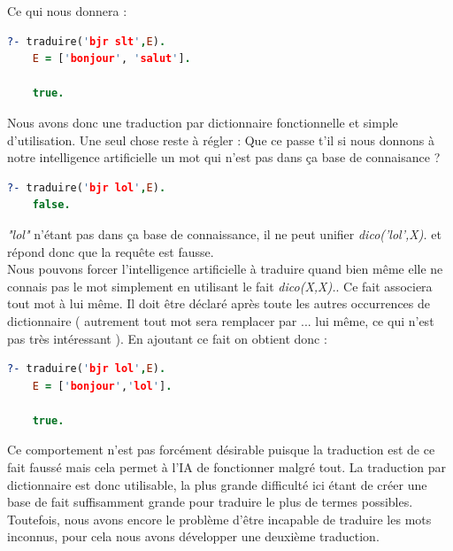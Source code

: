 \documentclass[11pt]{book}
\begin{document}
	Ce qui nous donnera :
	
	\begin{lstlisting}[language=Prolog]
	?- traduire('bjr slt',E).
	E = ['bonjour', 'salut'].
	
	true.
	\end{lstlisting}
	
	Nous avons donc une traduction par dictionnaire fonctionnelle et simple d'utilisation. Une seul chose reste à régler : Que ce passe t'il si nous donnons à notre intelligence artificielle un mot qui n'est pas dans ça base de connaisance ?
	
	\begin{lstlisting}[language=Prolog]
	?- traduire('bjr lol',E).
	false.
	\end{lstlisting}
	
	{\em "lol"} n'étant pas dans ça base de connaissance, il ne peut unifier {\em dico('lol',X).} et répond donc que la requête est fausse.\\
	Nous pouvons forcer l'intelligence artificielle à traduire quand bien même elle ne connais pas le mot simplement en utilisant le fait {\em dico(X,X).}. Ce fait associera tout mot à lui même. Il doit être déclaré après toute les autres occurrences de dictionnaire ( autrement tout mot sera remplacer par ... lui même, ce qui n'est pas très intéressant ). En ajoutant ce fait on obtient donc :
	
	\begin{lstlisting}[language=Prolog]
	?- traduire('bjr lol',E).
	E = ['bonjour','lol'].
	
	true.
	\end{lstlisting}
	
	Ce comportement n'est pas forcément désirable puisque la traduction est de ce fait faussé mais cela permet à l'IA de fonctionner malgré tout.
	La traduction par dictionnaire est donc utilisable, la plus grande difficulté ici étant de créer une base de fait suffisamment grande pour traduire le plus de termes possibles.\\
	Toutefois, nous avons encore le problème d'être incapable de traduire les mots inconnus, pour cela nous avons développer une deuxième traduction.
	
\end{document}
